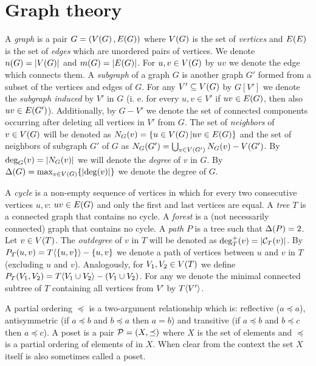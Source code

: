 \section{Graph theory}
A \textit{\gls{graph}} is a pair $G=\mathopen{}\left( V\mathopen{}\left( G \right), E\mathopen{}\left( G \right) \right)$ where $V\mathopen{}\left( G \right)$ is the set of \textit{vertices} and $E\mathopen{}\left( E \right)$ is the set of \textit{edges} which are unordered pairs of vertices. We denote $n\mathopen{}\left( G \right)=\mathopen{}\left| V\mathopen{}\left( G \right) \right|$ and $m\mathopen{}\left( G \right)=\mathopen{}\left| E\mathopen{}\left( G \right) \right|$. For $u,v \in V\mathopen{}\left( G \right)$ by $uv$ we denote the edge which connects them. A \textit{subgraph} of a graph $G$ is another graph $G'$ formed from a subset of the vertices and edges of $G$. For any $V'\subseteq V\mathopen{}\left( G \right)$ by $G[V']$ we denote the \textit{subgraph induced} by $V'$ in $G$ (i. e. for every $u,v\in V'$ if $uv\in E\mathopen{}\left( G \right)$, then also $uv\in E\mathopen{}\left( G' \right)$).  Additionally, by $G-V'$ we denote the set of connected components occurring after deleting all vertices in $V'$ from $G$. The set of \textit{neighbors} of $v\in V\mathopen{}\left( G \right)$ will be denoted as $N_G\mathopen{}\left( v \right) = \mathopen{}\left\{ u\in V\mathopen{}\left( G \right)|uv\in E\mathopen{}\left( G \right) \right\}$ and the set of neighbors of subgraph $G'$ of $G$ as $N_G\mathopen{}\left( G' \right) = \bigcup_{v\in V\mathopen{}\left( G' \right)}N_G\mathopen{}\left( v \right)-V\mathopen{}\left( G' \right)$. By $\deg_{G}\mathopen{}\left( v \right)=\mathopen{}\left| N_G\mathopen{}\left( v \right) \right|$ we will denote the \textit{degree} of $v$ in $G$. By $\Delta\mathopen{}\left( G \right) = \max_{v\in V\mathopen{}\left( G \right)}\mathopen{}\left\{ \mathopen{}\left| \deg\mathopen{}\left( v \right) \right| \right\}$ we denote the degree of $G$.

A \textit{cycle} is a non-empty sequence of vertices in which for every two consecutive vertices $u,v$: $uv \in E\mathopen{}\left( G \right)$ and only the first and last vertices are equal. A \textit{tree} $T$ is a connected graph that contains no cycle. A \textit{forest} is a (not necessarily connected) graph that contains no cycle. A \textit{path} $P$ is a tree such that $\Delta\mathopen{}\left( P \right) = 2$. Let $v\in V\mathopen{}\left( T \right)$. The \textit{outdegree} of $v$ in $T$ will be denoted as $\deg_T^+\mathopen{}\left( v \right)=\mathopen{}\left| \mathcal{C}_T\mathopen{}\left( v \right) \right|$.
By $P_{T}\mathopen{}\left( u, v \right)=T\mathopen{}\langle \mathopen{}\left\{ u,v \right\} \rangle-\mathopen{}\left\{ u,v \right\}$ we denote a path of vertices between $u$ and $v$ in $T$ (excluding $u$ and $v$). Analogously, for $V_1,V_2\in V\mathopen{}\left( T \right)$ we define $P_{T}\mathopen{}\left( V_1, V_2 \right)=T\mathopen{}\langle V_1\cup V_2 \rangle-\mathopen{}\left( V_1\cup V_2 \right)$.
For any we denote the minimal connected subtree of $T$ containing all vertices from $V'$ by $T\mathopen{}\langle V' \rangle$.

A partial ordering $\preceq$ is a two-argument relationship which is: reflective ($a\preceq a$), antisymmetric (if $a\preceq b$ and $b \preceq a$ then $a=b$) and transitive (if $a\preceq b$ and $b \preceq c$ then $a\preceq c$).
A poset is a pair $\mathcal{P}=\mathopen{}\left( X, \preceq \right)$ where $X$ is the set of elements and $\preceq$ is a partial ordering of elements of in $X$. When clear from the context the set $X$ itself is also sometimes called a poset. 
